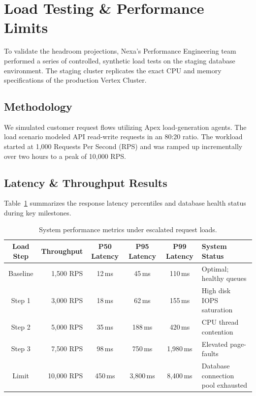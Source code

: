 \section{Load Testing \& Performance Limits}
\label{sec:load_testing}
To validate the headroom projections, Nexa's Performance Engineering team performed a series of controlled, synthetic load tests on the staging database environment. The staging cluster replicates the exact CPU and memory specifications of the production Vertex Cluster.

\subsection{Methodology}
We simulated customer request flows utilizing Apex load-generation agents. The load scenario modeled API read-write requests in an 80:20 ratio. The workload started at 1,000 Requests Per Second (RPS) and was ramped up incrementally over two hours to a peak of 10,000 RPS.

\subsection{Latency \& Throughput Results}
Table~\ref{tab:load_results} summarizes the response latency percentiles and database health status during key milestones.

\begin{table}[htbp]
  \centering
  \caption{System performance metrics under escalated request loads.}
  \label{tab:load_results}
  \begin{tabularx}{\textwidth}{c r c c c X}
    \toprule
    \textbf{Load Step} & \textbf{Throughput} & \textbf{P50 Latency} & \textbf{P95 Latency} & \textbf{P99 Latency} & \textbf{System Status} \\
    \midrule
    Baseline & 1,500 RPS & 12\,ms & 45\,ms & 110\,ms & Optimal; healthy queues \\
    \rowcolor{lightgray} Step 1 & 3,000 RPS & 18\,ms & 62\,ms & 155\,ms & High disk IOPS saturation \\
    Step 2 & 5,000 RPS & 35\,ms & 188\,ms & 420\,ms & CPU thread contention \\
    \rowcolor{lightgray} Step 3 & 7,500 RPS & 98\,ms & 750\,ms & 1,980\,ms & Elevated page-faults \\
    Limit & 10,000 RPS & 450\,ms & 3,800\,ms & 8,400\,ms & Database connection pool exhausted \\
    \bottomrule
  \end{tabularx}
\end{table}

